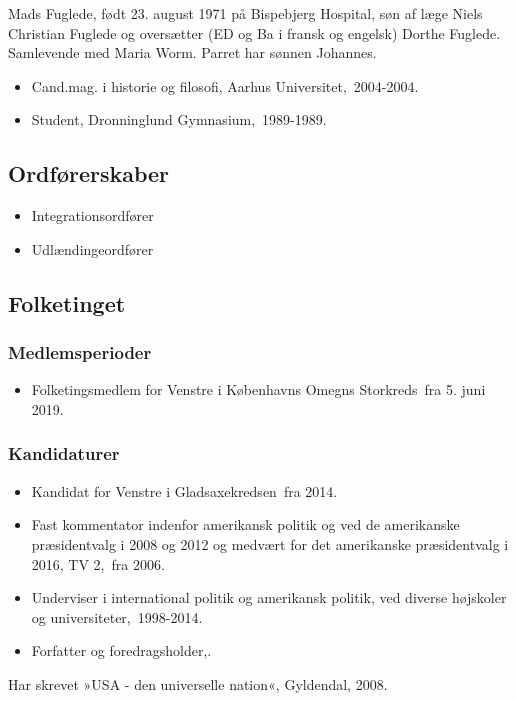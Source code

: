 \documentclass[11pt, a4paper]{awesome-cv}
\begin{document}
\makecvheader[R]
\makelettertitle
\begin{cvletter}
Mads Fuglede, født 23. august 1971 på Bispebjerg Hospital, søn af læge Niels Christian Fuglede og oversætter (ED og Ba i fransk og engelsk) Dorthe Fuglede. Samlevende med Maria Worm. Parret har sønnen Johannes.

\begin{itemize}
\item Cand.mag. i historie og filosofi, Aarhus Universitet, 2004-2004.
\item Student, Dronninglund Gymnasium, 1989-1989.
\end{itemize}
\subsection*{Ordførerskaber}
\begin{itemize}
\item Integrationsordfører
\item Udlændingeordfører
\end{itemize}
\subsection*{Folketinget}
\subsubsection*{Medlemsperioder}
\begin{itemize}
\item Folketingsmedlem for Venstre i Københavns Omegns Storkreds fra 5. juni 2019.
\end{itemize}
\subsubsection*{Kandidaturer}
\begin{itemize}
\item Kandidat for Venstre i Gladsaxekredsen fra 2014.
\end{itemize}
\begin{itemize}
\item Fast kommentator indenfor amerikansk politik og ved de amerikanske præsidentvalg i 2008 og 2012 og medvært for det amerikanske præsidentvalg i 2016, TV 2, fra 2006.
\item Underviser i international politik og amerikansk politik, ved diverse højskoler og universiteter, 1998-2014.
\item Forfatter og foredragsholder,.
\end{itemize}
Har skrevet »USA - den universelle nation«, Gyldendal, 2008.

\end{cvletter}
\end{document}
